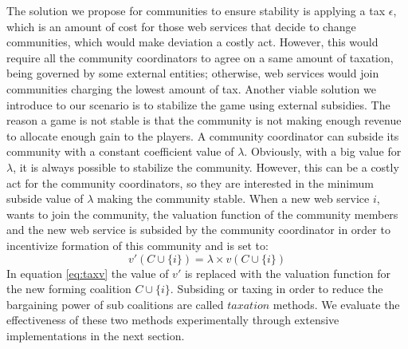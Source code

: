 \documentclass[10pt,journal,cspaper,compsoc]{IEEEtran}
\begin{document}
The solution we propose for communities to ensure  stability is
applying a tax $\epsilon$, which is an amount of cost for those
web services that decide to change communities, which would make
deviation a costly act. However, this would require all the
community coordinators to agree on a same amount of taxation,
being governed by some external entities; otherwise, web services
would join communities charging the lowest amount of tax. Another
viable solution we introduce to our scenario is to stabilize the
game using external subsidies. The reason a game is not stable is
that the community is not making enough revenue to allocate enough
gain to the players. A community coordinator can subside its community
with a constant coefficient value of $\lambda$.
%
%
Obviously, with a big value for $\lambda$, it is always possible
to stabilize the community. However, this can be a costly act for
the community coordinators, so they are interested in the minimum
subside value of $\lambda$ making the community stable. When a new web service $i$, wants to join the community, the valuation function of the community members and the new web service is subsided by the community coordinator in order to incentivize formation of this community and is set to:
\begin{equation}\label{taxv}
v'(C \cup \{i\}) = \lambda \times v(C \cup \{i\})
\end{equation}
In equation \ref{eq:taxv} the value of $v'$ is replaced with the valuation function for the new forming coalition $C \cup \{i\}$.
Subsiding or taxing in order to reduce the bargaining power of sub
coalitions are called $taxation$ \cite{eps346856} methods. We
evaluate the effectiveness of these two methods experimentally
through extensive implementations in the next section.



\end{document}
